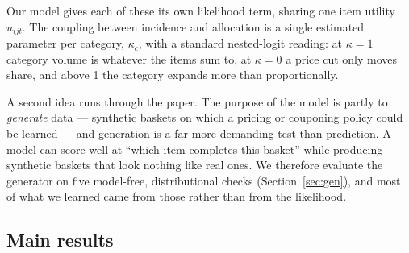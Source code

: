 \documentclass[11pt]{article}
\begin{document}
Our model gives each of these its own likelihood term, sharing one item utility
$u_{ijt}$. The coupling between incidence and allocation is a single estimated parameter
per category, $\kappa_c$, with a standard nested-logit reading: at $\kappa=1$ category
volume is whatever the items sum to, at $\kappa=0$ a price cut only moves share, and
above 1 the category expands more than proportionally.

A second idea runs through the paper. The purpose of the model is partly to
\emph{generate} data --- synthetic baskets on which a pricing or couponing policy could
be learned --- and generation is a far more demanding test than prediction. A model can
score well at ``which item completes this basket'' while producing synthetic baskets
that look nothing like real ones. We therefore evaluate the generator on five
model-free, distributional checks (Section~\ref{sec:gen}), and most of what we learned
came from those rather than from the likelihood.

\subsection{Main results}
\end{document}
